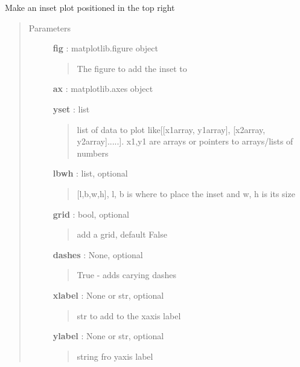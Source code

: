 \documentclass[letterpaper,10pt,english]{sphinxmanual}
\begin{document}
\begin{fulllineitems}
\label{pubplots:pubplots.plot.inset_plot}
Make an inset plot positioned in the top right
\begin{quote}\begin{description}
\item[{Parameters}] \leavevmode
\textbf{fig} : matplotlib.figure object
\begin{quote}

The figure to add the inset to
\end{quote}

\textbf{ax} : matplotlib.axes object

\textbf{yset} : list
\begin{quote}

list of data to plot like{[}{[}x1array, y1array{]}, {[}x2array, y2array{]}.....{]}.
x1,y1 are arrays or pointers to arrays/lists of numbers
\end{quote}

\textbf{lbwh} : list, optional
\begin{quote}

{[}l,b,w,h{]}, l, b is where to place the inset and w, h is its size
\end{quote}

\textbf{grid} : bool, optional
\begin{quote}

add a grid, default False
\end{quote}

\textbf{dashes} : None, optional
\begin{quote}

True - adds carying dashes
\end{quote}

\textbf{xlabel} : None or str, optional
\begin{quote}

str to add to the xaxis label
\end{quote}

\textbf{ylabel} : None or str, optional
\begin{quote}

string fro yaxis label
\end{quote}


\end{description}
\end{quote}
\end{fulllineitems}
\end{document}
